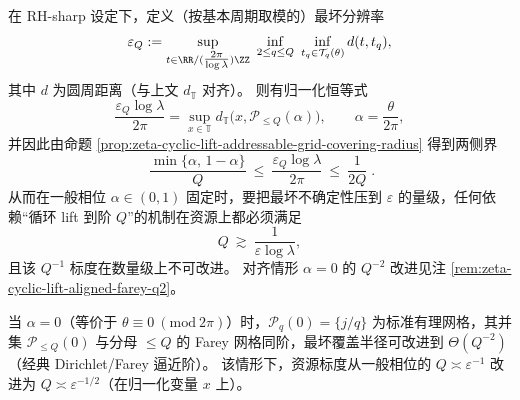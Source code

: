 \begin{corollary}\label{cor:zeta-cyclic-lift-resolution-law}
在 RH-sharp 设定下，定义（按基本周期取模的）最坏分辨率
\[
\varepsilon_Q:=\sup_{t\in \RR/(\tfrac{2\pi}{\log\lambda})\ZZ}\ \inf_{2\le q\le Q}\ \inf_{t_q\in\mathcal T_q(\theta)} d(t,t_q),
\]
其中 \(d\) 为圆周距离（与上文 \(d_{\mathbb T}\) 对齐）。
则有归一化恒等式
\[
\frac{\varepsilon_Q\log\lambda}{2\pi}
=\sup_{x\in\mathbb T} d_{\mathbb T}\bigl(x,\mathcal P_{\le Q}(\alpha)\bigr),
\qquad \alpha=\frac{\theta}{2\pi},
\]
并因此由命题 \ref{prop:zeta-cyclic-lift-addressable-grid-covering-radius} 得到两侧界
\[
\boxed{\;
\frac{\min\{\alpha,\,1-\alpha\}}{Q}
\ \le\
\frac{\varepsilon_Q\log\lambda}{2\pi}
\ \le\
\frac{1}{2Q}\; }.
\]
从而在一般相位 \(\alpha\in(0,1)\) 固定时，要把最坏不确定性压到 \(\varepsilon\) 的量级，任何依赖“循环 lift 到阶 \(Q\)”的机制在资源上都必须满足
\[
Q\ \gtrsim\ \frac{1}{\varepsilon\log\lambda},
\]
且该 \(Q^{-1}\) 标度在数量级上不可改进。
对齐情形 \(\alpha=0\) 的 \(Q^{-2}\) 改进见注 \ref{rem:zeta-cyclic-lift-aligned-farey-q2}。
\end{corollary}

\begin{remark}[对齐情形 \texorpdfstring{$\alpha=0$}{alpha=0} 与 \texorpdfstring{$Q^{-2}$}{Q^-2} 改进]\label{rem:zeta-cyclic-lift-aligned-farey-q2}
当 \(\alpha=0\)（等价于 \(\theta\equiv 0\ (\mathrm{mod}\ 2\pi)\)）时，\(\mathcal P_q(0)=\{j/q\}\) 为标准有理网格，其并集 \(\mathcal P_{\le Q}(0)\) 与分母 \(\le Q\) 的 Farey 网格同阶，最坏覆盖半径可改进到 \(\Theta(Q^{-2})\)（经典 Dirichlet/Farey 逼近阶）。
该情形下，资源标度从一般相位的 \(Q\asymp \varepsilon^{-1}\) 改进为 \(Q\asymp \varepsilon^{-1/2}\)（在归一化变量 \(x\) 上）。
\end{remark}

